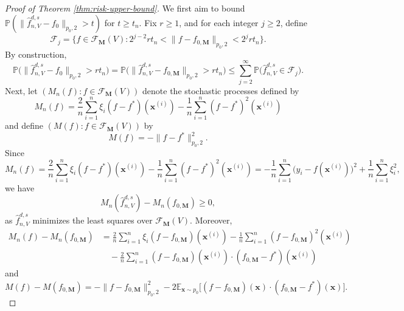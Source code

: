\documentclass[10pt]{article}
\newcommand{\E}{{\mathbb E}}
\newcommand{\F}{{\mathcal{F}}}
\renewcommand{\P}{{\mathbb P}}
\newcommand{\lsefstinf}{{\hat{f}^{d, s}_{n, V}}}
\newcommand{\xbf}{{\mathbf{x}}}
\newcommand{\Mbf}{{\mathbf{M}}}
\begin{document}
\begin{proof}[Proof of Theorem \ref{thm:risk-upper-bound}]
We first aim to bound $\P(\|\lsefstinf - f_0\|_{p_0, 2} > t)$ for $t \ge t_n$. 
Fix $r \ge 1$, and for each integer $j \ge 2$, define 
\begin{equation*}
    \F_j = \big\{ f \in \F_{\Mbf}(V): 
    2^{j - 2} r t_n < \|f - f_{0, \Mbf}\|_{p_0, 2} < 2^j r t_n \big\}.
\end{equation*}
By construction, 
\begin{equation*}
    \P\big(\|\lsefstinf - f_{0}\|_{p_0, 2} > rt_n \big)
    = \P\big(\|\lsefstinf - f_{0, \Mbf}\|_{p_0, 2} > rt_n \big) 
    \le \sum_{j = 2}^{\infty} \P\big(\lsefstinf \in \F_j\big).
\end{equation*}
Next, let $(M_n(f): f \in \F_{\Mbf}(V))$ denote the stochastic processes defined by
\begin{equation*}
    M_n(f) = \frac{2}{n} \sum_{i = 1}^{n} \xi_i (f - f^*)(\xbf^{(i)}) 
    - \frac{1}{n} \sum_{i = 1}^{n} (f - f^*)^2(\xbf^{(i)})
\end{equation*}
and define $(M(f): f \in \F_{\Mbf}(V))$ by 
\begin{equation*}
    M(f) = - \|f - f^*\|_{p_0, 2}^2.
\end{equation*}
Since 
\begin{equation*}
    M_n(f) = \frac{2}{n} \sum_{i = 1}^{n} \xi_i (f - f^*)(\xbf^{(i)}) 
    - \frac{1}{n} \sum_{i = 1}^{n} (f - f^*)^2(\xbf^{(i)})
    = - \frac{1}{n} \sum_{i = 1}^{n} \big(y_i - f(\xbf^{(i)})\big)^2 
    + \frac{1}{n} \sum_{i = 1}^{n} \xi_i^2, 
\end{equation*}
we have 
\begin{equation*}
    M_n(\lsefstinf) - M_n(f_{0, \Mbf}) \ge 0,
\end{equation*}
as $\lsefstinf$ minimizes the least squares over $\F_{\Mbf}(V)$.
Moreover, 
\begin{equation*}
\begin{aligned}
    M_n(f) - M_n(f_{0, \Mbf}) 
    &= \frac{2}{n} \sum_{i = 1}^{n} \xi_i (f - f_{0, \Mbf})(\xbf^{(i)})
    - \frac{1}{n} \sum_{i = 1}^{n} (f - f_{0, \Mbf})^2(\xbf^{(i)}) \\
    &\quad- \frac{2}{n} \sum_{i = 1}^{n} (f - f_{0, \Mbf})(\xbf^{(i)})
    \cdot (f_{0, \Mbf} - f^*)(\xbf^{(i)})
\end{aligned}
\end{equation*}
and
\begin{equation*}
    M(f) - M(f_{0, \Mbf}) 
    = - \|f - f_{0, \Mbf}\|_{p_0, 2}^2 
    - 2 \E_{\xbf \sim p_0} \big[(f - f_{0, \Mbf})(\xbf) 
    \cdot (f_{0, \Mbf} - f^*)(\xbf)\big].
\end{equation*}

\end{proof}
\end{document}
